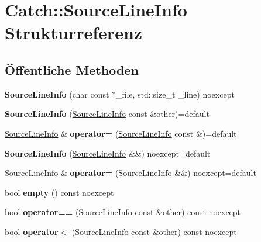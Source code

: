 \hypertarget{structCatch_1_1SourceLineInfo}{}\section{Catch\+:\+:Source\+Line\+Info Strukturreferenz}
\label{structCatch_1_1SourceLineInfo}
\subsection*{Öffentliche Methoden}
\begin{DoxyCompactItemize}
\item 
\mbox{\label{structCatch_1_1SourceLineInfo_a48510b82a39a042ab370ed143dd30c10}} 
{\bfseries Source\+Line\+Info} (char const $\ast$\+\_\+file, std\+::size\+\_\+t \+\_\+line) noexcept
\item 
\mbox{\label{structCatch_1_1SourceLineInfo_a7c44c9986c33a9cf842b791374332d41}} 
{\bfseries Source\+Line\+Info} (\hyperlink{structCatch_1_1SourceLineInfo}{Source\+Line\+Info} const \&other)=default
\item 
\mbox{\label{structCatch_1_1SourceLineInfo_a1a6cfc0197357ef4e329bb256aa8a354}} 
\hyperlink{structCatch_1_1SourceLineInfo}{Source\+Line\+Info} \& {\bfseries operator=} (\hyperlink{structCatch_1_1SourceLineInfo}{Source\+Line\+Info} const \&)=default
\item 
\mbox{\label{structCatch_1_1SourceLineInfo_a5ea6179645457b8ec961aec9ca4c5588}} 
{\bfseries Source\+Line\+Info} (\hyperlink{structCatch_1_1SourceLineInfo}{Source\+Line\+Info} \&\&) noexcept=default
\item 
\mbox{\label{structCatch_1_1SourceLineInfo_ab8469b89d86bdd69b6b9f2b610600258}} 
\hyperlink{structCatch_1_1SourceLineInfo}{Source\+Line\+Info} \& {\bfseries operator=} (\hyperlink{structCatch_1_1SourceLineInfo}{Source\+Line\+Info} \&\&) noexcept=default
\item 
\mbox{\label{structCatch_1_1SourceLineInfo_a10a5b5b7dff82971879c2eb8d83f9b3b}} 
bool {\bfseries empty} () const noexcept
\item 
\mbox{\label{structCatch_1_1SourceLineInfo_af07e4fdeddf8409b91e4f842f6264cf8}} 
bool {\bfseries operator==} (\hyperlink{structCatch_1_1SourceLineInfo}{Source\+Line\+Info} const \&other) const noexcept
\item 
\mbox{\label{structCatch_1_1SourceLineInfo_af77415416919d2d6030b4be085b92f7a}} 
bool {\bfseries operator$<$} (\hyperlink{structCatch_1_1SourceLineInfo}{Source\+Line\+Info} const \&other) const noexcept
\end{DoxyCompactItemize}
